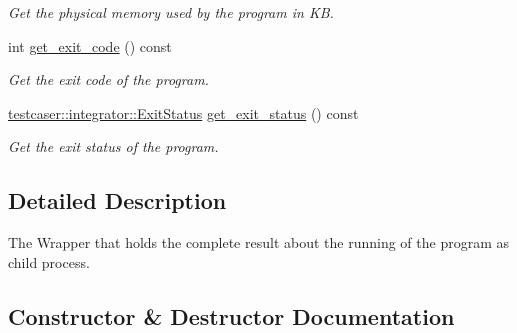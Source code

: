\begin{DoxyCompactItemize}
\begin{DoxyCompactList}\small\item\em Get the physical memory used by the program in KB. \end{DoxyCompactList}\item 
int \mbox{\hyperlink{classtestcaser_1_1integrator_1_1Result_a0795d3307ac8c3186288020bc75b3767}{get\+\_\+exit\+\_\+code}} () const
\begin{DoxyCompactList}\small\item\em Get the exit code of the program. \end{DoxyCompactList}\item 
\mbox{\hyperlink{namespacetestcaser_1_1integrator_a68fcfdfd3f063954e9fd1a94f4b4f755}{testcaser\+::integrator\+::\+Exit\+Status}} \mbox{\hyperlink{classtestcaser_1_1integrator_1_1Result_aadd7237340243c5506d1fbf23f30e9d5}{get\+\_\+exit\+\_\+status}} () const
\begin{DoxyCompactList}\small\item\em Get the exit status of the program. \end{DoxyCompactList}\end{DoxyCompactItemize}


\subsection{Detailed Description}
The Wrapper that holds the complete result about the running of the program as child process. 



\subsection{Constructor \& Destructor Documentation}
\mbox{\label{classtestcaser_1_1integrator_1_1Result_a74713e8425d62a6ea2e349b8255e3a95}} 
